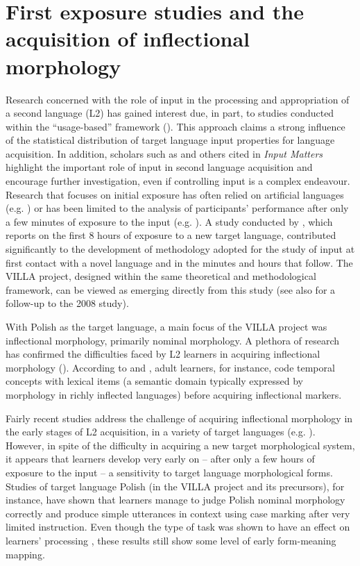 \documentclass[output=paper,colorlinks,citecolor=brown,modfonts,nonflat]{../langscibook}
\begin{document}
\section{First exposure studies and the acquisition of inflectional morphology}\label{sec:watorek:2}

Research concerned with the role of input in the processing and appropriation of a second language (L2) has gained interest due, in part, to studies conducted within the “usage-based” framework (\citealt{Tomasello2003,Ellis2008}). This approach claims a strong influence of the statistical distribution of target language input properties for language acquisition. In addition, scholars such as \citet{Flege2009} and others cited in  \textit{Input Matters} highlight the important role of input in second language acquisition and encourage further investigation, even if controlling input is a complex endeavour. Research that focuses on initial exposure has often relied on artificial languages (e.g. \citealt{Reber1967, HulstijnDeKeyser1997, Williams2005}) or has been limited to the analysis of participants’ performance after only a few minutes of exposure to the input (e.g. \citealt{GullbergEtAl2012}). A study conducted by \citet{Rast2008}, which reports on the first 8 hours of exposure to a new target language, contributed significantly to the development of methodology adopted for the study of input at first contact with a novel language and in the minutes and hours that follow. The VILLA project, designed within the same theoretical and methodological framework, can be viewed as emerging directly from this study (see also \citealt{Rast2017} for a follow-up to the 2008 study).

With Polish as the target language, a main focus of the VILLA project was inflectional morphology, primarily nominal morphology. A plethora of research has confirmed the difficulties faced by L2 learners in acquiring inflectional morphology (\citealt{Bardovi-Harlig2000, Larsen-Freeman2010}). According to \citet{Meisel1987, Bardovi-Harlig1992, KleinPerdue1997} and \citet{Starren2001}, adult learners, for instance, code temporal concepts with lexical items (a semantic domain typically expressed by morphology in richly inflected languages) before acquiring inflectional markers.

Fairly recent studies address the challenge of acquiring inflectional morphology in the early stages of L2 acquisition, in a variety of target languages (e.g. \citealt{CarrollWidjaja2013,HanLiu2013,HinzEtAl2013,RastEtAl2014}). However, in spite of the difficulty in acquiring a new target morphological system, it appears that learners develop very early on – after only a few hours of exposure to the input – a sensitivity to target language morphological forms. Studies of target language Polish (in the VILLA project and its precursors), for instance, have shown that learners manage to judge Polish nominal morphology correctly and produce simple utterances in context using case marking after very limited instruction. Even though the type of task was shown to have an effect on learners’ processing \citep{WatorekEtAl2016}, these results still show some level of early form-meaning mapping.
\end{document}
